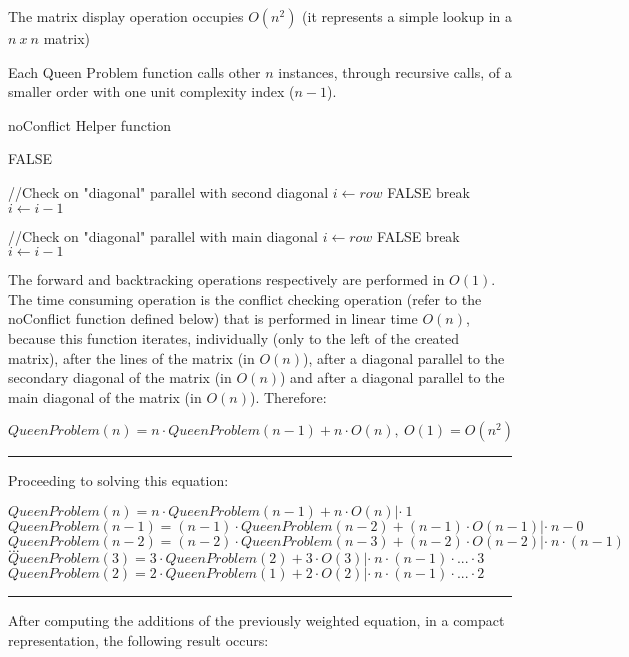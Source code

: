 The matrix display operation occupies $ O (n ^ 2) $ (it represents a simple lookup in a $n\ x\ n$ matrix)

Each Queen Problem function calls other $ n $ instances, through recursive calls, of a smaller order with one unit complexity index ($ n-1 $).


\begin{algorithm}[H]
    \caption{noConflict Helper function}
    \begin{algorithmic}[1]
        \State \Return FALSE
        \EndIf
        \EndFor


        //Check on "diagonal" parallel with second diagonal
        \State $i \gets row$
        \State \Return FALSE
        \EndIf
        \State break
        \EndIf
        \State $i \gets i-1$
        \EndFor

        //Check on "diagonal" parallel with main diagonal
        \State $i \gets row$
        \State \Return FALSE
        \EndIf
        \State break
        \EndIf
        \State $i \gets i-1$
        \EndFor

        \EndProcedure

    \end{algorithmic}
\end{algorithm}

The forward and backtracking operations respectively are performed in $ O (1) $. The time consuming operation is the conflict checking operation (refer to the noConflict function defined below) that is performed in linear time $ O (n) $, because this function iterates, individually (only to the left of the created matrix), after the lines of the matrix (in $ O (n) $), after a diagonal parallel to the secondary diagonal of the matrix (in $ O (n) $) and after a diagonal parallel to the main diagonal of the matrix (in $ O (n) $).
Therefore:

$QueenProblem(n) = n \cdot QueenProblem(n-1) + n \cdot O(n),\ O(1)=O(n^2)$ \\
\noindent\rule{16cm}{0.4pt}
Proceeding to solving this equation:


$QueenProblem(n) = n \cdot QueenProblem(n-1) + n \cdot O(n) |\cdot\ 1$ \\
$QueenProblem(n-1) = (n-1) \cdot QueenProblem(n-2) + (n-1) \cdot O(n-1) |\cdot\ n-0$ \\
$QueenProblem(n-2) = (n-2) \cdot QueenProblem(n-3) + (n-2) \cdot O(n-2) |\cdot\ n\cdot (n-1)$ \\
$...$ \\
$QueenProblem(3) = 3 \cdot QueenProblem(2) + 3 \cdot O(3) |\cdot\ n\cdot (n-1) \cdot ... \cdot 3$ \\
$QueenProblem(2) = 2 \cdot QueenProblem(1) + 2 \cdot O(2) |\cdot\ n\cdot (n-1) \cdot ... \cdot 2$ \\
\noindent\rule{16cm}{0.4pt}
After computing the additions of the previously weighted equation, in a compact representation, the following result occurs:

